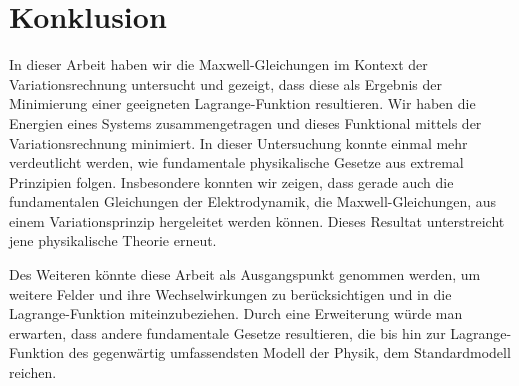 %
%
%
%
\section{Konklusion}

In dieser Arbeit haben wir die Maxwell-Gleichungen im Kontext der Variationsrechnung untersucht und gezeigt, dass diese als Ergebnis der Minimierung einer geeigneten Lagrange-Funktion resultieren. Wir haben die Energien eines Systems zusammengetragen und dieses Funktional mittels der Variationsrechnung minimiert.
In dieser Untersuchung konnte einmal mehr verdeutlicht werden, wie fundamentale physikalische Gesetze aus extremal Prinzipien folgen. 
Insbesondere konnten wir zeigen, dass gerade auch die fundamentalen Gleichungen der Elektrodynamik, die Maxwell-Gleichungen, aus einem Variationsprinzip hergeleitet werden können. Dieses Resultat unterstreicht jene physikalische Theorie erneut. 

Des Weiteren könnte diese Arbeit als Ausgangspunkt genommen werden, um weitere Felder und ihre Wechselwirkungen zu berücksichtigen und in die Lagrange-Funktion miteinzubeziehen. Durch eine Erweiterung würde man erwarten, dass andere fundamentale Gesetze resultieren, die bis hin zur Lagrange-Funktion des gegenwärtig umfassendsten Modell der Physik, dem Standardmodell reichen.
